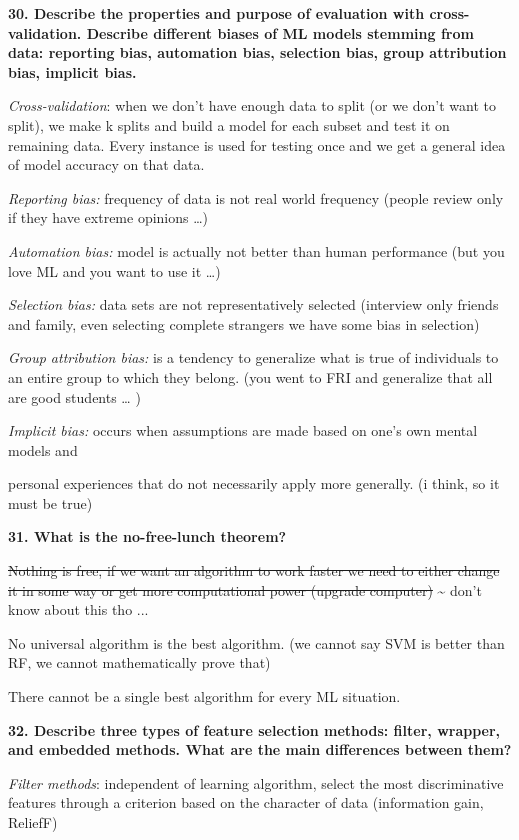 \textbf{30. Describe the properties and purpose of evaluation with
cross-validation. Describe different biases of ML models stemming from
data: reporting bias, automation bias, selection bias, group attribution
bias, implicit bias.}

\textit{Cross-validation}: when we don't have enough data to split
(or we don't want to split), we make k splits and build a model for each
subset and test it on remaining data. Every instance is used for testing
once and we get a general idea of model accuracy on that data.

\textit{Reporting bias:} frequency of data is not real world
frequency (people review only if they have extreme opinions \ldots)

\textit{Automation bias:} model is actually not better than human
performance (but you love ML and you want to use it \ldots)

\textit{Selection bias:} data sets are not representatively selected
(interview only friends and family, even selecting complete strangers we
have some bias in selection)

\textit{Group attribution bias:} is a tendency to generalize what is
true of individuals to an entire group to which they belong. (you went
to FRI and generalize that all are good students \ldots{} )

\textit{Implicit bias:} occurs when assumptions are made based on
one's own mental models and

personal experiences that do not necessarily apply more generally. (i
think, so it must be true)

\textbf{31. What is the no-free-lunch theorem?}

\sout{Nothing is free, if we want an algorithm to work faster we need to
either change it in some way or get more computational power (upgrade
computer)} \textasciitilde{} don't know about this tho ...

No universal algorithm is the best algorithm. (we cannot say SVM is
better than RF, we cannot mathematically prove that)

There cannot be a single best algorithm for every ML situation.

\textbf{32. Describe three types of feature selection methods: filter,
wrapper, and embedded methods. What are the main differences between
them?}

\textit{Filter methods}: independent of learning algorithm, select
the most discriminative features through a criterion based on the
character of data (information gain, ReliefF)

